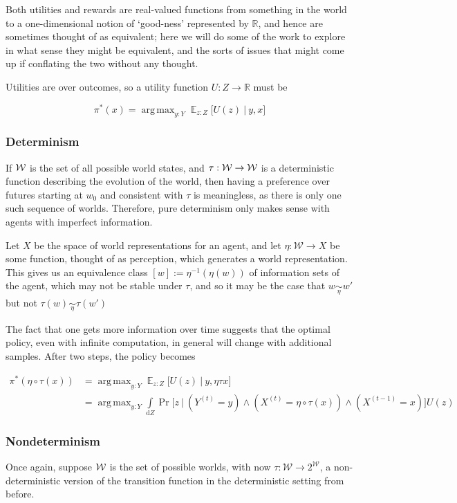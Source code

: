 \documentclass{book}
\DeclareMathOperator*{\argmax}{arg\,max}
\DeclareMathOperator*{\E}{\mathbb E}
\begin{document}
	Both utilities and rewards are real-valued functions from something in the world to a one-dimensional notion of `good-ness' represented by $\mathbb R$, and hence are sometimes thought of as equivalent; here we will do some of the work to explore in what sense they might be equivalent, and the sorts of issues that might come up if conflating the two without any thought.
	
	Utilities are over outcomes, so a utility function $U : Z \to \mathbb R$ must be
	
	\[ \pi^*(x) = \argmax_{y: Y} \E_{z : Z} \Big[ U(z)~\Big|~ y,x\Big] \]
	
	\subsubsection{Determinism}
	If $\cal W$ is the set of all possible world states, and $\tau: \cal W \to W$ is a deterministic function describing the evolution of the world, then having a preference over futures starting at $w_0$ and consistent with $\tau$ is meaningless, as there is only one such sequence of worlds. Therefore, pure determinism only makes sense with agents with imperfect information. 
	
	Let $X$ be the space of world representations for an agent, and let $\eta: \mathcal W \to X$ be some function, thought of as perception, which generates a world representation. This gives us an equivalence class $[w] := \eta^{-1}(\eta(w))$ of information sets of the agent, which may not be stable under $\tau$, and so it may be the case that $w \underset\eta\sim w'$ but not $\tau(w) \underset\eta\sim \tau(w')$
	
	
	
	The fact that one gets more information over time suggests that the optimal policy, even with infinite computation, in general will change with additional samples. After two steps, the policy becomes
	
	\begin{align*}
		\pi^*(\eta\circ\tau (x)) &= \argmax_{y: Y} \E_{z : Z} \Big[ U(z)~\Big|~ y,\eta\tau x \Big]  \\
			&= \argmax_{y: Y} \int\limits_{\mathrm dZ} \Pr\Big[z~\Big|~\left(Y^{(t)} = y \right) \land \left(X^{(t)}= \eta \circ \tau (x)\right) \land \left(X^{(t-1)} = x \right) \Big] U(z)
	\end{align*}
		
	
	\subsubsection{Nondeterminism}
	Once again, suppose $\cal W$ is the set of possible worlds, with now $\tau: \mathcal W \to 2^{\mathcal W}$, a non-deterministic version of the transition function in the deterministic setting from before.
	
\end{document}
